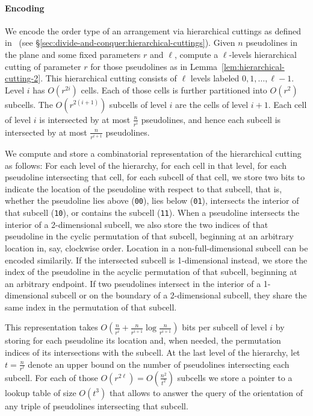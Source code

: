 \paragraph*{Encoding}
%
We encode the order type of an arrangement via
hierarchical cuttings as defined in~\cite{C93} (see
\S\ref{sec:divide-and-conquer:hierarchical-cuttings}).
%
Given \(n\) pseudolines in the plane and some fixed
parameters \(r\) and \(\ell\), compute a \(\ell\)-levels hierarchical cutting
of parameter \(r\) for those
pseudolines as in Lemma~\ref{lem:hierarchical-cutting-2}.
This hierarchical cutting consists of \( \ell \) levels
labeled \(0,1,\ldots,\ell-1\). Level \(i\) has \(O(r^{2i})\)
cells. Each of those cells is further partitioned into
\(O(r^2)\) subcells. The \(O(r^{2(i+1)})\) subcells of level \(i\)
are the cells of level \(i+1\). Each cell of level \(i\) is intersected by at
most \(\frac{n}{r^i}\) pseudolines, and hence each subcell is intersected by at
most \(\frac{n}{r^{i+1}}\) pseudolines.

We compute and store a combinatorial representation of the hierarchical cutting
as follows: For each level of the hierarchy, for each cell in that level, for
each pseudoline intersecting that cell, for each subcell of that cell, we store
two bits to indicate the location of the pseudoline with respect to that
subcell\ifeurocg\else, that is, whether the pseudoline lies above
(\texttt{00}), lies below (\texttt{01}), intersects the interior of that
subcell (\texttt{10}), or contains the subcell (\texttt{11})\fi.
When a pseudoline intersects the interior of a 2-dimensional subcell, we also
store the two indices of that pseudoline
in the cyclic permutation of that subcell, beginning at an
arbitrary location in, say, clockwise order.
\ifeurocg%
Location in a non-full-dimensional subcell can be encoded similarily.
\else%
If the intersected subcell is
1-dimensional instead, we store the index of the pseudoline in the acyclic
permutation of that subcell, beginning at an arbitrary endpoint.
If two pseudolines intersect in the interior of a 1-dimensional subcell or on
the boundary of a 2-dimensional subcell, they share the same index in the
permutation of that subcell.
\fi%

\ifeurocg\else
This representation takes \(O(\frac{n}{r^i} + \frac{n}{r^{i+1}}
\log{\frac{n}{r^{i+1}}})\) bits per subcell of level \(i\) by storing for each
pseudoline its location and, when needed, the permutation indices of its
intersections with the subcell. At the last level of the hierarchy, let \(t =
\frac{n}{r^\ell}\) denote an upper bound on the number of pseudolines
intersecting each subcell. For each of those \(O(r^{2 \ell}) =
O(\frac{n^2}{t^2})\) subcells we store a pointer to a lookup table of size
\(O(t^3)\) that allows to answer the query of the orientation of any
triple of pseudolines intersecting that subcell.
\fi

